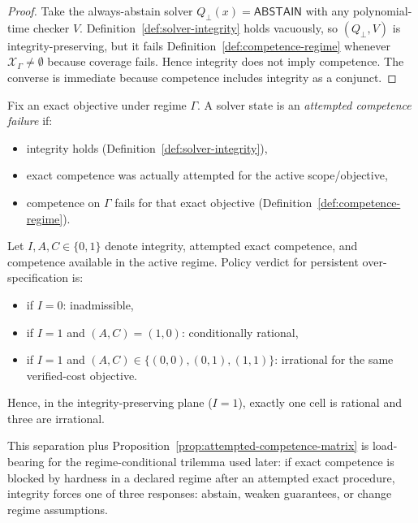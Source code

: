 \begin{proof}
Take the always-abstain solver $Q_\bot(x)=\mathsf{ABSTAIN}$ with any polynomial-time checker $V$. Definition~\ref{def:solver-integrity} holds vacuously, so $(Q_\bot,V)$ is integrity-preserving, but it fails Definition~\ref{def:competence-regime} whenever $\mathcal{X}_\Gamma\neq\emptyset$ because coverage fails. Hence integrity does not imply competence. The converse is immediate because competence includes integrity as a conjunct.
\end{proof}

\begin{definition}\label{def:attempted-competence-failure}
Fix an exact objective under regime $\Gamma$. A solver state is an \emph{attempted competence failure} if:
\begin{itemize}
\item integrity holds (Definition~\ref{def:solver-integrity}),
\item exact competence was actually attempted for the active scope/objective,
\item competence on $\Gamma$ fails for that exact objective (Definition~\ref{def:competence-regime}).
\end{itemize}
\end{definition}

\begin{proposition}\label{prop:attempted-competence-matrix}
Let $I,A,C\in\{0,1\}$ denote integrity, attempted exact competence, and competence available in the active regime. Policy verdict for persistent over-specification is:
\begin{itemize}
\item if $I=0$: inadmissible,
\item if $I=1$ and $(A,C)=(1,0)$: conditionally rational,
\item if $I=1$ and $(A,C)\in\{(0,0),(0,1),(1,1)\}$: irrational for the same verified-cost objective.
\end{itemize}
Hence, in the integrity-preserving plane ($I=1$), exactly one cell is rational and three are irrational.
\end{proposition}

This separation plus Proposition~\ref{prop:attempted-competence-matrix} is load-bearing for the regime-conditional trilemma used later: if exact competence is blocked by hardness in a declared regime after an attempted exact procedure, integrity forces one of three responses: abstain, weaken guarantees, or change regime assumptions.

